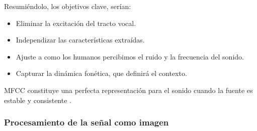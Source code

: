 \documentclass[11pt,a4paper,spanish]{book}
\begin{document}
	Resumiéndolo, los objetivos clave, serían:
	\begin{itemize}
		\item Eliminar la excitación del tracto vocal.
		\item Independizar las características extraídas.
		\item Ajuste a como los humanos percibimos el ruido y la frecuencia del sonido.
		\item Capturar la dinámica fonética, que definirá el contexto.
	\end{itemize}
	MFCC constituye una perfecta representación para el sonido cuando la fuente es estable y consistente \cite{Farouk2014}. 
	

	\subsubsection{Procesamiento de la señal como imagen}

	
\end{document}
